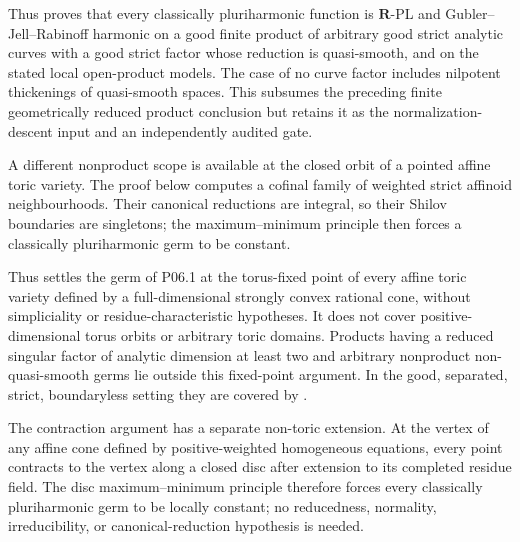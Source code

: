 Thus  proves that every
classically pluriharmonic function is \(\mathbf R\)-PL and
Gubler--Jell--Rabinoff harmonic on a good finite product of arbitrary good
strict analytic curves with a good strict factor whose reduction is
quasi-smooth, and on the stated local open-product models.  The case of no
curve factor includes nilpotent thickenings of quasi-smooth spaces.  This
subsumes the preceding finite geometrically reduced product conclusion but
retains it as the normalization-descent input and an independently audited
gate.

A different nonproduct scope is available at the closed orbit of a pointed
affine toric variety.  The proof below computes a cofinal family of weighted
strict affinoid neighbourhoods.  Their canonical reductions are integral,
so their Shilov boundaries are singletons; the maximum--minimum principle
then forces a classically pluriharmonic germ to be constant.


\begingroup
\makeatletter
\let\pzeroonesixtoric@original@nonumberplain\th@nonumberplain
\def\th@nonumberplain{%
  \pzeroonesixtoric@original@nonumberplain
  \def\@opargbegintheorem##1##2##3{%
    \item[\theorem@headerfont\hskip\labelsep ##3\theorem@separator]}}
\makeatother

\endgroup

Thus  settles the germ of P06.1
at the torus-fixed point of every affine toric variety defined by a
full-dimensional strongly convex rational cone, without simpliciality or
residue-characteristic hypotheses.  It does not cover positive-dimensional
torus orbits or arbitrary toric domains. Products having a reduced singular
factor of analytic dimension at least two and arbitrary nonproduct
non-quasi-smooth germs lie outside this fixed-point argument. In the good,
separated, strict, boundaryless setting they are covered by
.

The contraction argument has a separate non-toric extension.  At the vertex
of any affine cone defined by positive-weighted homogeneous equations, every
point contracts to the vertex along a closed disc after extension to its
completed residue field.  The disc maximum--minimum principle therefore
forces every classically pluriharmonic germ to be locally constant; no
reducedness, normality, irreducibility, or canonical-reduction hypothesis is
needed.

